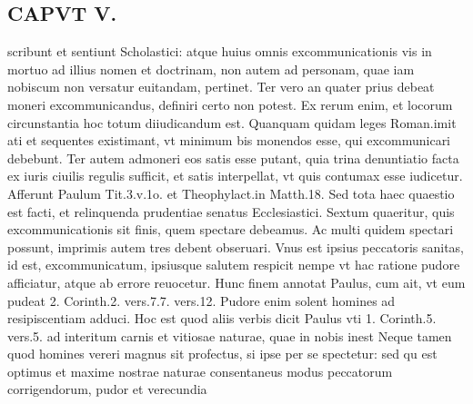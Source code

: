 \documentclass{article}
\begin{document}
\begin{pages}
\section*{CAPVT  V. }
\marginpar{[ p.399 ]}\pstart scribunt et sentiunt Scholastici: atque huius omnis excommunicationis vis in mortuo ad illius nomen et doctrinam, non autem ad personam, quae iam nobiscum non versatur euitandam, pertinet. Ter vero an quater prius debeat moneri excommunicandus, definiri certo non potest. Ex rerum enim, et locorum circunstantia hoc totum diiudicandum est. Quanquam quidam leges Roman.imit ati et sequentes existimant, vt minimum bis monendos esse, qui excommunicari debebunt. Ter autem admoneri eos satis esse putant, quia trina denuntiatio facta ex iuris ciuilis regulis sufficit, et satis interpellat, vt quis contumax esse iudicetur. Afferunt Paulum Tit.3.v.1o. et Theophylact.in Matth.18. Sed tota haec quaestio est facti, et relinquenda prudentiae senatus Ecclesiastici. Sextum quaeritur, quis excommunicationis sit finis, quem spectare debeamus. Ac multi quidem spectari possunt, imprimis autem tres debent obseruari. Vnus est ipsius peccatoris sanitas, id est, excommunicatum, ipsiusque salutem respicit nempe vt hac ratione pudore afficiatur, atque ab errore reuocetur. Hunc finem annotat Paulus, cum ait, vt eum pudeat 2. Corinth.2. vers.7.7. vers.12. Pudore enim solent homines ad resipiscentiam adduci. Hoc est quod aliis verbis dicit Paulus vti 1. Corinth.5. vers.5. ad interitum carnis et vitiosae naturae, quae in nobis inest Neque tamen quod homines vereri magnus sit profectus, si ipse per se spectetur: sed qu est optimus et maxime nostrae naturae consentaneus modus peccatorum corrigendorum, pudor et verecundia  \pend

\end{pages}
\end{document}
